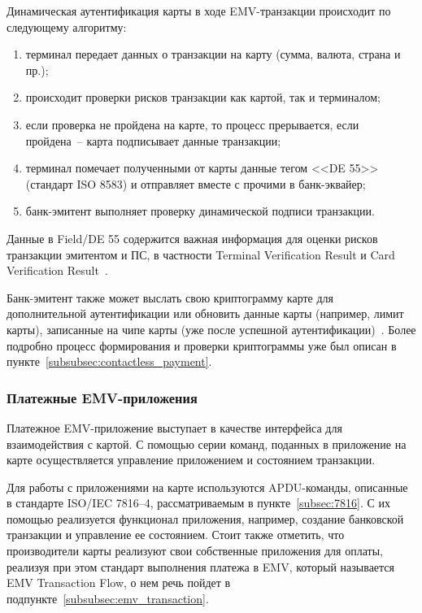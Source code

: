 Динамическая аутентификация карты в ходе EMV-транзакции происходит по следующему алгоритму:

\begin{enumerate}
    \item терминал передает данных о транзакции на карту (сумма, валюта, страна и пр.);
    \item происходит проверки рисков транзакции как картой, так и терминалом;
    \item если проверка не пройдена на карте, то процесс прерывается, если пройдена~-- карта подписывает данные транзакции;
    \item терминал помечает полученными от карты данные тегом <<DE 55>> (стандарт ISO 8583) и отправляет вместе с прочими в банк-эквайер;
    \item банк-эмитент выполняет проверку динамической подписи транзакции.
\end{enumerate}

Данные в Field/DE 55 содержится важная информация для оценки рисков транзакции  эмитентом и ПС, в частности Terminal Verification Result и Card Verification Result~\cite{emv_card_mechanism}.

Банк-эмитент также может выслать свою криптограмму карте для дополнительной аутентификации или обновить данные карты (например, лимит карты), записанные на чипе карты (уже после успешной аутентификации)~\cite{emv_book_2}.
Более подробно процесс формирования и проверки криптограммы уже был описан в пункте~\ref{subsubsec:contactless_payment}.

\subsubsection{Платежные EMV-приложения}

Платежное EMV-приложение выступает в качестве интерфейса для взаимодействия с картой.
С помощью серии команд, поданных в приложение на карте осуществляется управление приложением и состоянием транзакции.

Для работы с приложениями на карте используются APDU-команды, описанные в стандарте ISO/IEC 7816--4, рассматриваемым в пункте~\ref{subsec:7816}.
С их помощью реализуется функционал приложения, например, создание банковской транзакции и управление ее состоянием.
Стоит также отметить, что производители карты реализуют свои собственные приложения для оплаты, реализуя при этом стандарт выполнения платежа в EMV, который называется EMV Transaction Flow, о нем речь пойдет в подпункте~\ref{subsubsec:emv_transaction}.

